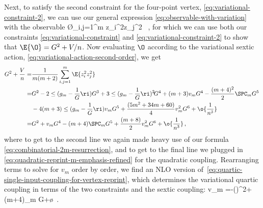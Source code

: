 Next, to satisfy the second constraint for the four-point vertex, \eqref{eq:variational-constraint-2}, we can use our general expression \eqref{eq:observable-with-variation} with the observable 
\be
\O \equiv {}\sum_{i,j=1}^m z_i^2z_j^2 \, ,
\ee
for which we can use both our constraints \eqref{eq:variational-constraint} and \eqref{eq:variational-constraint-2} to show that $\E{\O}= G^2+V/n$.
Now evaluating $\O$ according to the variational sextic action, \eqref{eq:variational-action-second-order}, we get
\begin{align}
G^2+\frac{V}{n}=&\frac{1}{m(m+2)}\sum_{i,j=1}^m\E{z_i^2z_j^2}\, \\
=&G^2
-2\le(g_m-\frac{1}{G}\ri)G^3
+3\le(g_m-\frac{1}{G}\ri)^2\!G^4
+(m+3)v_m G^4
-\frac{(m+4)^2}{2}\SPC_m G^5
\, \notag\\
&-4(m+3)\le(g_m-\frac{1}{G}\ri)v_m G^5
+\frac{(5m^2+34m+60)}{4}v_m^2 G^6
+\o{\frac{1}{n^3}}\, \notag\\
=&G^2+v_mG^4-(m+4)\SPC_m G^5+\frac{(m+8)}{2}v_m^2G^6+\o{\frac{1}{n^3}}\, ,
\end{align}
where to get to the second line we again made heavy use of our formula \eqref{eq:combinatorial-2m-resurrection}, and to get to the final line we plugged in \eqref{eq:quadratic-reprint-m-emphasis-refined} for the quadratic coupling. 
Rearranging terms to solve for $v_m$ order by order, we find an NLO version of~\eqref{eq:quartic-single-input-coupling-for-vertex-reprint}, which determines the variational quartic coupling in terms of the two constraints and the sextic coupling: 
\be\label{eq:quartic-single-input-coupling-for-vertex-refined}
v_m =-\le(\ri)^2+(m+4)\SPC_m G+\o{}\, .
\ee






